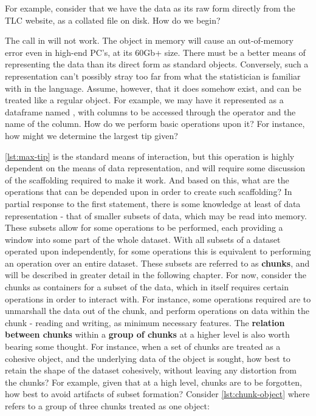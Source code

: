 For example, consider that we have the data as its raw form directly from the TLC website, as a collated  file on disk.
How do we begin?


The call in  will not work.
The object in memory will cause an out-of-memory error even in high-end PC's, at its 60Gb+ size.
There must be a better means of representing the data than its direct form as standard \R{} objects.
Conversely, such a representation can't possibly stray too far from what the statistician is familiar with in the language.
Assume, however, that it does somehow exist, and can be treated like a regular object.
For example, we may have it represented as a dataframe named , with columns to be accessed through the  operator and the name of the column.
How do we perform basic operations upon it?
For instance, how might we determine the largest tip given?


\cref{lst:max-tip} is the standard means of interaction, but this operation is highly
dependent on the means of data representation, and will require some
discussion of the scaffolding required to make it work.
And based on this, what are the operations that can be depended upon in order to create such scaffolding?
In partial response to the first statement, there is some knowledge at least of data representation - that of smaller subsets of data, which may be read into memory.
These subsets allow for some operations to be performed, each providing a window into some part of the whole dataset.
With all subsets of a dataset operated upon independently, for some operations this is equivalent to performing an operation over an entire dataset.
These subsets are referred to as \textbf{chunks}, and will be described in greater detail in the following chapter.
For now, consider the chunks as containers for a subset of the data, which in itself requires certain operations in order to interact with.
For instance, some operations required are to unmarshall the data out of the chunk, and perform operations on data within the chunk - reading and writing, as minimum necessary features.
The \textbf{relation between chunks} within a \textbf{group of chunks} at a higher level is also worth bearing some thought.
For instance, when a set of chunks are treated as a cohesive object, and the underlying data of the object is sought, how best to retain the shape of the dataset cohesively, without leaving any distortion from the chunks?
For example, given that at a high level, chunks are to be forgotten, how best to avoid artifacts of subset formation?
Consider \cref{lst:chunk-object} where  refers to a group of three chunks treated as one object:

